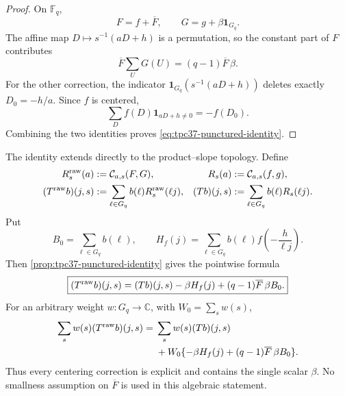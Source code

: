 \begin{proof}
On \(\mathbb F_q\),
\begin{equation}
 F=f+\overline F,
 \qquad
 G=g+\beta\mathbf 1_{G_q}.
 \label{eq:tpc37-punctured-decompositions}
\end{equation}
The affine map \(D\mapsto s^{-1}(aD+h)\) is a permutation, so the
constant part of \(F\) contributes
\begin{equation}
 \overline F\sum_U G(U)=(q-1)\overline F\,\beta.
 \label{eq:tpc37-F-mean-contribution}
\end{equation}
For the other correction, the indicator
\(\mathbf 1_{G_q}(s^{-1}(aD+h))\) deletes exactly
\(D_0=-h/a\).  Since \(f\) is centered,
\begin{equation}
 \sum_D f(D)\mathbf 1_{aD+h\ne0}
 =-f(D_0).
 \label{eq:tpc37-deleted-residue}
\end{equation}
Combining the two identities proves
\eqref{eq:tpc37-punctured-identity}.
\end{proof}

The identity extends directly to the product--slope topology.  Define
\begin{align}
 R_s^{\rm raw}(a)&:=\mathcal C_{a,s}(F,G),
 &R_s(a)&:=\mathcal C_{a,s}(f,g),
 \label{eq:tpc37-raw-centered-R}\\
 (T^{\rm raw}b)(j,s)&:=\sum_{\ell\in G_q}b(\ell)R_s^{\rm raw}(\ell j),
 &(Tb)(j,s)&:=\sum_{\ell\in G_q}b(\ell)R_s(\ell j).
 \label{eq:tpc37-raw-centered-T}
\end{align}
Put
\begin{equation}
 B_0=\sum_{\ell\in G_q}b(\ell),
 \qquad
 H_f(j)=\sum_{\ell\in G_q}
 b(\ell)f\!\left(-\frac h{\ell j}\right).
 \label{eq:tpc37-rank-one-data}
\end{equation}
Then \cref{prop:tpc37-punctured-identity} gives the pointwise formula
\begin{equation}
 \boxed{
 (T^{\rm raw}b)(j,s)
 =(Tb)(j,s)-\beta H_f(j)
 +(q-1)\overline F\,\beta B_0.}
 \label{eq:tpc37-product-punctured-identity}
\end{equation}
For an arbitrary weight \(w:G_q\to\mathbb C\), with
\(W_0=\sum_s w(s)\),
\begin{align}
 \sum_s w(s)(T^{\rm raw}b)(j,s)
 ={}&\sum_s w(s)(Tb)(j,s) \notag\\
 &+W_0\{-\beta H_f(j)
 +(q-1)\overline F\,\beta B_0\}.
 \label{eq:tpc37-weighted-punctured-identity}
\end{align}
Thus every centering correction is explicit and contains the single
scalar \(\beta\).  No smallness assumption on \(\overline F\) is used in
this algebraic statement.

